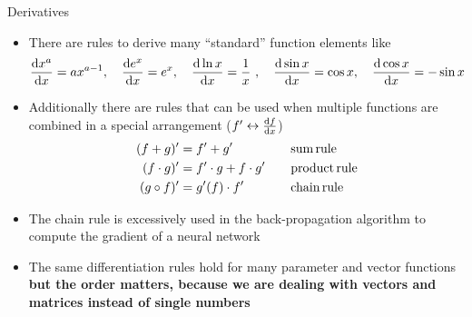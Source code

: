   \begin{frame}{Derivatives}
    \begin{itemize}
      \item There are rules to derive many \enquote{standard} function elements like
      \begin{equation*}
        \dderiv{x^a}{x} = ax^{a-1} ,\quad \dderiv{e^x}{x} = e^x ,\quad \dderiv{\ln x}{x} = \frac{1}{x} ,\quad \dderiv{\sin x}{x} = \cos{x} ,\quad \dderiv{\cos x}{x} = -\sin x
      \end{equation*}
      \item Additionally there are rules that can be used when multiple functions are combined in a special arrangement ($f' \leftrightarrow \frac{\mathrm{d}f}{\mathrm{d}x}$)
      \begin{align*}
        (f + g)' &= f' + g' &&\quad\text{sum\,rule} \\
        (f \cdot g)' &= f' \cdot g + f \cdot g' &&\quad\text{product\,rule} \\
        (g \circ f)' &= g'(f) \cdot f' &&\quad\text{chain\,rule}
      \end{align*}
      \item The chain rule is excessively used in the back-propagation algorithm to compute the gradient of a neural network
      \item The same differentiation rules hold for many parameter and vector functions \textbf{but the order matters, because we are dealing with vectors and matrices instead of single numbers}
    \end{itemize}
  \end{frame}

